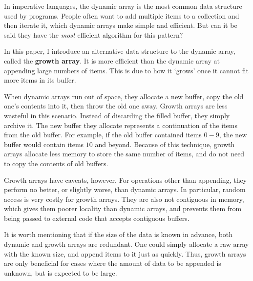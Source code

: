 In imperative languages, the dynamic array is the most common data structure used by programs. People often want to add multiple items to a collection and then iterate it, which dynamic arrays make simple and efficient. But can it be said they have the \textit{most} efficient algorithm for this pattern?

In this paper, I introduce an alternative data structure to the dynamic array, called the \textbf{growth array}. It is more efficient than the dynamic array at appending large numbers of items. This is due to how it `grows' once it cannot fit more items in its buffer.

When dynamic arrays run out of space, they allocate a new buffer, copy the old one's contents into it, then throw the old one away. Growth arrays are less wasteful in this scenario. Instead of discarding the filled buffer, they simply archive it. The new buffer they allocate represents a continuation of the items from the old buffer. For example, if the old buffer contained items $0 - 9$, the new buffer would contain items $10$ and beyond. Because of this technique, growth arrays allocate less memory to store the same number of items, and do not need to copy the contents of old buffers.

Growth arrays have caveats, however. For operations other than appending, they perform no better, or slightly worse, than dynamic arrays. In particular, random access is very costly for growth arrays. They are also not contiguous in memory, which gives them poorer locality than dynamic arrays, and prevents them from being passed to external code that accepts contiguous buffers.

It is worth mentioning that if the size of the data is known in advance, both dynamic and growth arrays are redundant. One could simply allocate a raw array with the known size, and append items to it just as quickly. Thus, growth arrays are only beneficial for cases where the amount of data to be appended is unknown, but is expected to be large.